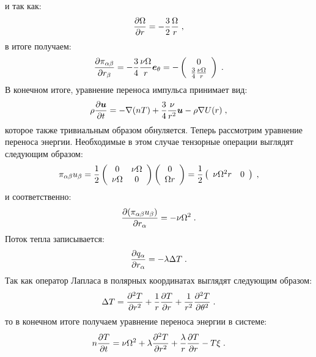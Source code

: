 и так как:
\begin{equation}
    \frac{\partial\Omega}{\partial r}=-\frac{3}{2}\frac{\Omega}{r}\;,
\end{equation}
в итоге получаем:
\begin{equation}
    \frac{\partial\pi_{\alpha\beta}}{\partial r_{\beta}}=-\frac{3}{4}\frac{\nu\Omega}{r}\bm{e}_{\theta}=-\left(\begin{array}{c}
        0 \\ \frac{3}{4}\frac{\nu\Omega}{r}
    \end{array}\right)\;.
\end{equation}
В конечном итоге, уравнение переноса импульса принимает вид:
\begin{equation}
    \rho\frac{\partial\bm{u}}{\partial t} = -\nabla(nT)+\frac{3}{4}\frac{\nu}{r^2}\bm{u}-\rho\nabla U(r)\;,
\end{equation} 
которое также тривиальным образом обнуляется.
Теперь рассмотрим уравнение переноса энергии. Необходимые в этом случае тензорные операции выглядят следующим образом:
\begin{equation}
    \pi_{\alpha\beta}u_{\beta} = \frac{1}{2}\left(\begin{array}{cc}
        0 & \nu\Omega \\
        \nu\Omega & 0
    \end{array}\right)\left(\begin{array}{c}
        0 \\ \Omega r        
    \end{array}\right) = \frac{1}{2}\left(\begin{array}{cc}
        \nu\Omega^2 r & 0        
    \end{array}\right)\;,
\end{equation}
и соответственно:
\begin{equation}
    \frac{\partial(\pi_{\alpha\beta}u_{\beta})}{\partial r_{\alpha}} = -\nu\Omega^2\;.
\end{equation}
Поток тепла записывается:
\begin{equation}
    \frac{\partial q_{\alpha}}{\partial r_{\alpha}} = -\lambda\Delta T\;.
\end{equation}
Так как оператор Лапласа в полярных координатах выглядят следующим образом:
\begin{equation}
    \Delta T = \frac{\partial^2 T}{\partial r^2}+\frac{1}{r}\frac{\partial T}{\partial r}+\frac{1}{r^2}\frac{\partial^2 T}{\partial\theta^2}\;.
\end{equation}
то в конечном итоге получаем уравнение переноса энергии в системе:
\begin{equation}
    n\frac{\partial T}{\partial t} = \nu\Omega^2 + \lambda\frac{\partial^2T}{\partial r^2} + \frac{\lambda}{r}\frac{\partial T}{\partial r} - T\xi\;.
\end{equation}


